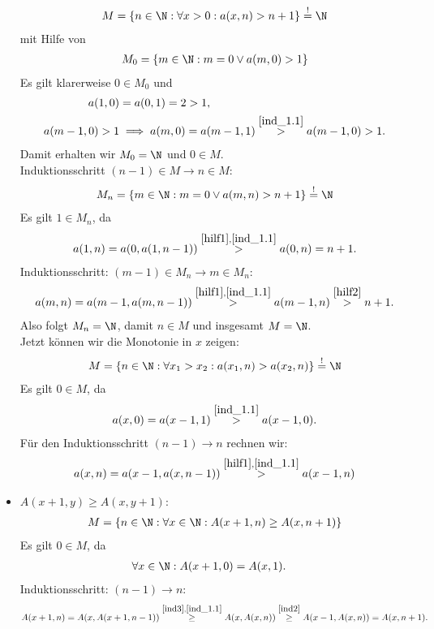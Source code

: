 \begin{solution}
\begin{itemize}
\begin{align}
    M = \{n \in \N: \forall x > 0: a(x,n) > n + 1\} \stackrel{!}{=} \N
  \end{align}
  mit Hilfe von
  \begin{align*}
    M_0 =  \{m \in \N: m = 0 \lor a(m,0) > 1\}
  \end{align*}
  Es gilt klarerweise $0 \in M_0$ und
  \begin{align*}
    a(1,0) &= a(0,1) = 2 > 1, \\
    a(m-1,0) > 1 &\implies a(m,0) = a(m-1,1) \stackrel{\eqref{ind_1.1}}{>} a(m-1,0) > 1.
  \end{align*}
  Damit erhalten wir $M_0 = \N$ und $0 \in M$. \\
  Induktionsschritt $(n-1) \in M \rightarrow n \in M$:
  \begin{align}\label{hilf2}
    M_n =  \{m \in \N: m = 0 \lor a(m,n) > n + 1\} \stackrel{!}{=} \N
  \end{align}
  Es gilt $1 \in M_n$, da
  \begin{align*}
    a(1,n) = a(0,a(1,n-1)) \stackrel{\eqref{hilf1},\eqref{ind_1.1}}{>} a(0,n) = n + 1.
  \end{align*}
  Induktionsschritt: $(m-1) \in M_n \rightarrow m \in M_n$:
  \begin{align*}
    a(m,n) = a(m-1,a(m,n-1)) \stackrel{\eqref{hilf1},\eqref{ind_1.1}}{>}
    a(m-1,n) \stackrel{\eqref{hilf2}}{>} n + 1.
  \end{align*}
  Also folgt $M_n = \N$, damit $n \in M$ und insgesamt $M = \N$. \\
  Jetzt können wir die Monotonie in $x$ zeigen:
  \begin{align}\label{ind2}
    M = \{n \in \N: \forall x_1 > x_2: a(x_1,n) > a(x_2,n)\} \stackrel{!}{=} \N
  \end{align}
  Es gilt $0 \in M$, da
  \begin{align*}
    a(x,0) = a(x-1,1) \stackrel{\eqref{ind_1.1}}{>} a(x-1,0).
  \end{align*}
  Für den Induktionsschritt $(n-1) \rightarrow n$ rechnen wir:
  \begin{align*}
    a(x,n) = a(x-1,a(x,n-1)) \stackrel{\eqref{hilf1},\eqref{ind_1.1}}{>} a(x-1,n)
  \end{align*}
  \item $A(x+1,y) \geq A(x,y+1)$:
  \begin{align}\label{ind3}
    M = \{n \in \N: \forall x \in \N: A(x+1,n) \geq A(x,n+1)\}
  \end{align}
  Es gilt $0 \in M$, da
  \begin{align*}
    \forall x \in \N: A(x+1,0) &= A(x,1).
  \end{align*}
  Induktionsschritt: $(n-1) \rightarrow n$:
  \begin{align*}
    A(x+1,n) = A(x,A(x+1,n-1)) \stackrel{\eqref{ind3},\eqref{ind_1.1}}{\geq} A(x,A(x,n))
    \stackrel{\eqref{ind2}}{\geq} A(x-1,A(x,n)) = A(x,n+1).
  \end{align*}
\end{itemize}

\end{solution}
